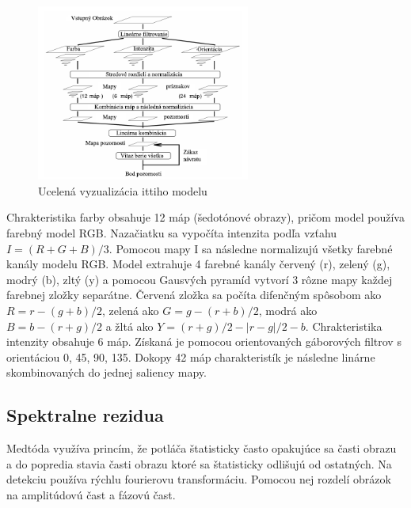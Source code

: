 \begin{figure}[H]
 \centering
 \includegraphics[width=7cm]{pics/itti-1-svk.png}
 \caption{Ucelená vyzualizácia ittiho modelu\cite{itty-98}}\label{wrap-fig:1}
\end{figure}
\vspace{10mm}

Chrakteristika farby obsahuje 12 máp (šedotónové obrazy), pričom model používa farebný model RGB.
Nazačiatku sa vypočíta intenzita podľa vzťahu \begin{math} I = (R+G+B)/3\end{math}.
Pomocou mapy I sa následne normalizujú všetky farebné kanály modelu RGB.
Model extrahuje 4 farebné kanály červený (r), zelený (g), modrý (b), zltý (y) a pomocou Gausvých pyramíd vytvorí 3 rôzne mapy každej farebnej zložky separátne.
Červená zložka sa počíta difenčným spôsobom ako \begin{math} R = r - (g + b)/2 \end{math}, zelená ako \begin{math} G = g - (r + b)/2 \end{math}, modrá ako \begin{math}B = b - (r + g)/2\end{math} a žltá ako \begin{math}Y = (r + g)/2 - |r - g|/2 - b\end{math}.
Chrakteristika intenzity obsahuje 6 máp.
Získaná je pomocou orientovaných gáborových filtrov s orientáciou 0\degree, 45\degree, 90\degree, 135\degree.
Dokopy 42 máp charakteristík je následne linárne skombinovaných do jednej saliency mapy\cite{itty-98}.


\subsection{Spektralne rezidua}
Medtóda využíva princím, že potláča štatisticky často opakujúce sa časti obrazu a do popredia stavia časti obrazu ktoré sa štatisticky odlišujú od ostatných.
Na detekciu používa rýchlu fourierovu transformáciu.
Pomocou nej rozdelí obrázok na amplitúdovú čast a fázovú čast.

